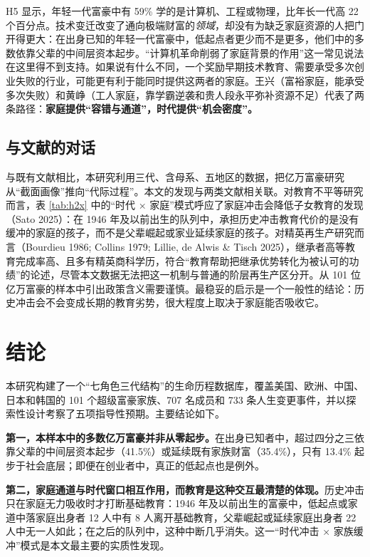 \documentclass[UTF8,a4paper,11pt]{ctexart}
\begin{document}
H5 显示，年轻一代富豪中有 59\% 学的是计算机、工程或物理，比年长一代高 22 个百分点。技术变迁改变了通向极端财富的\emph{领域}，却没有为缺乏家庭资源的人把门开得更大：在出身已知的年轻一代富豪中，低起点者更少而不是更多，他们中的多数依靠父辈的中间层资本起步。“计算机革命削弱了家庭背景的作用”这一常见说法在这里得不到支持。如果说有什么不同，一个奖励早期技术教育、需要承受多次创业失败的行业，可能更有利于能同时提供这两者的家庭。王兴（富裕家庭，能承受多次失败）和黄峥（工人家庭，靠学霸逆袭和贵人段永平弥补资源不足）代表了两条路径：\textbf{家庭提供“容错与通道”，时代提供“机会密度”。}

\subsection{与文献的对话}

与既有文献相比，本研究利用三代、含母系、五地区的数据，把亿万富豪研究从“截面画像”推向“代际过程”。本文的发现与两类文献相关联。对教育不平等研究而言，表 \ref{tab:h2x} 中的“时代 × 家庭”模式呼应了家庭冲击会降低子女教育的发现（Sato 2025）：在 1946 年及以前出生的队列中，承担历史冲击教育代价的是没有缓冲的家庭的孩子，而不是父辈崛起或家业延续家庭的孩子。对精英再生产研究而言（Bourdieu 1986; Collins 1979; Lillie, de Alwis \& Tisch 2025），继承者高等教育完成率高、且多有精英商科学历，符合“教育帮助把继承优势转化为被认可的功绩”的论述，尽管本文数据无法把这一机制与普通的阶层再生产区分开。从 101 位亿万富豪的样本中引出政策含义需要谨慎。最稳妥的启示是一个一般性的结论：历史冲击会不会变成长期的教育劣势，很大程度上取决于家庭能否吸收它。

\section{结论}
\label{sec:conclusion}

本研究构建了一个“七角色三代结构”的生命历程数据库，覆盖美国、欧洲、中国、日本和韩国的 101 个超级富豪家族、707 名成员和 733 条人生变更事件，并以探索性设计考察了五项指导性预期。主要结论如下。

\textbf{第一，本样本中的多数亿万富豪并非从零起步。}在出身已知者中，超过四分之三依靠父辈的中间层资本起步（41.5\%）或延续既有家族财富（35.4\%），只有 13.4\% 起步于社会底层；即便在创业者中，真正的低起点也是例外。

\textbf{第二，家庭通道与时代窗口相互作用，而教育是这种交互最清楚的体现。}历史冲击只在家庭无力吸收时才打断基础教育：1946 年及以前出生的富豪中，低起点或家道中落家庭出身者 12 人中有 8 人离开基础教育，父辈崛起或延续家庭出身者 22 人中无一人如此；在之后的队列中，这种中断几乎消失。这一“时代冲击 × 家族缓冲”模式是本文最主要的实质性发现。
\end{document}
